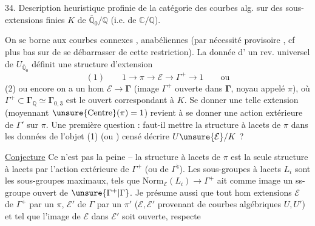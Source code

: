 34. Description heuristique profinie de la catégorie
des courbes alg.  sur  des sous-
extensions finies $K$ de $\overline{\mathbb Q}_0/\mathbb Q$ (i.e. de $\mathbb C/\mathbb Q$).

On se borne aux courbes  connexes , anabéliennes
(par nécessité provisoire \unsure{!}, cf plus bas sur  de
se débarrasser de cette restriction). La donnée d'
un rev. universel de  $U_{\overline{\mathbb Q}_0}$ définit une
structure d'extension
\[
(1)\qquad 1\longrightarrow\pi\longrightarrow\mathcal E\longrightarrow\Gamma^{+}\longrightarrow1\qquad\text{ou}
\]
(2) ou encore on a un hom $\mathcal E\longrightarrow\boldsymbol{\Gamma}$
(image $\Gamma^{+}$ ouverte dans $\boldsymbol{\Gamma}$,
noyau appelé $\pi$),
où $\Gamma^{+}\subset\boldsymbol{\Gamma}_{\mathbb Q}\simeq\boldsymbol{\Gamma}_{0,3}$ est le  ouvert
correspondant à $K$. Se donner une telle
extension (moyennant $\unsure{\mathrm{Centre}}(\pi)=1$) revient à
se donner une action extérieure de $\Gamma'$ sur $\pi$.
Une première question : faut-il mettre la
structure à lacets de $\pi$ dans les  données  de
l'objet (1) (ou ) censé décrire $U\unsure{\mathcal E}/K$ ?

\uline{Conjecture} Ce n'est pas la peine -- la structure à lacets
de $\pi$ est la seule structure à lacets 
par l'action extérieure de $\Gamma^{+}$ (ou de $\Gamma^{\natural}$). Les
sous-groupes à lacets $L_i$ sont les sous-groupes
maximaux, tels que $\mathrm{Norm}_{\mathcal E}(L_i)\longrightarrow\Gamma^{+}$ ait
comme image un ss-groupe ouvert de $\unsure{\Gamma^{+}|\Gamma}$.
Je
présume aussi que tout hom  extensions
$\mathcal E$ de $\Gamma^{+}$ par un $\pi$, $\mathcal E'$ de $\Gamma$ par un $\pi'$
($\mathcal E,\mathcal E'$ provenant de courbes algébriques $U,U'$) et tel
que l'image de $\mathcal E$ dans $\mathcal E'$ soit ouverte, respecte
